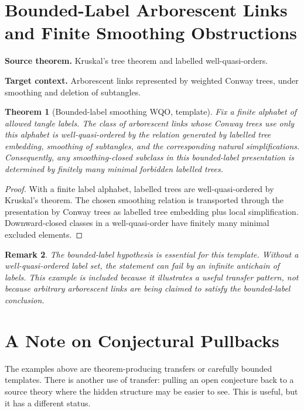 \documentclass[11pt]{article}
\newtheorem{theorem}{Theorem}[section]
\newtheorem{remark}[theorem]{Remark}
\begin{document}
\section{Bounded-Label Arborescent Links and Finite Smoothing Obstructions}

\textbf{Source theorem.}
Kruskal's tree theorem and labelled well-quasi-orders.

\textbf{Target context.}
Arborescent links represented by weighted Conway trees, under smoothing and deletion of subtangles.

\begin{theorem}[Bounded-label smoothing WQO, template]
Fix a finite alphabet of allowed tangle labels. The class of arborescent links whose Conway trees use only this alphabet is well-quasi-ordered by the relation generated by labelled tree embedding, smoothing of subtangles, and the corresponding natural simplifications. Consequently, any smoothing-closed subclass in this bounded-label presentation is determined by finitely many minimal forbidden labelled trees.
\end{theorem}

\begin{proof}
With a finite label alphabet, labelled trees are well-quasi-ordered by Kruskal's theorem. The chosen smoothing relation is transported through the presentation by Conway trees as labelled tree embedding plus local simplification. Downward-closed classes in a well-quasi-order have finitely many minimal excluded elements.
\end{proof}

\begin{remark}
The bounded-label hypothesis is essential for this template. Without a well-quasi-ordered label set, the statement can fail by an infinite antichain of labels. This example is included because it illustrates a useful transfer pattern, not because arbitrary arborescent links are being claimed to satisfy the bounded-label conclusion.
\end{remark}

\section{A Note on Conjectural Pullbacks}

The examples above are theorem-producing transfers or carefully bounded templates. There is another use of transfer: pulling an open conjecture back to a source theory where the hidden structure may be easier to see. This is useful, but it has a different status.
\end{document}

